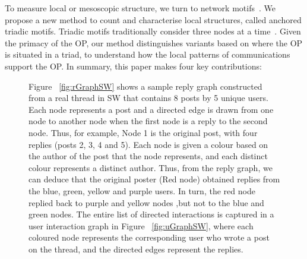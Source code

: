 To measure local or mesoscopic structure, we turn to network motifs~\cite{milo2002network}. We propose a new method to count and characterise local structures, called anchored triadic motifs. Triadic motifs traditionally consider three nodes at a time~\cite{milo2002network}. Given the primacy of the OP, our method distinguishes variants based on where the OP is situated in a triad, to understand how the local patterns of  communications support the OP.  
In summary, this paper makes four key contributions: 

\begin{figure}[!h]
    \centering
\hspace{30mm}
    
    \caption{ Figure ~\ref{fig:rGraphSW} shows a sample reply graph constructed from a real thread in SW that contains 8 posts by 5 unique users. Each node represents a post and a directed edge is drawn from one node to another node when the first node is a reply to the second node. Thus, for example, Node 1 is the original post, with four replies (posts 2, 3, 4 and 5). Each node is given a colour based on the author of the post that the node represents, and each distinct colour represents a distinct author. Thus, from the reply graph, we can deduce that the original poster (Red node) obtained replies from the blue, green, yellow and purple users. In turn, the red node replied back to purple and yellow nodes ,but not to the blue and green nodes. The entire list of directed interactions is captured in a user interaction graph in Figure ~\ref{fig:uGraphSW}, where each coloured node represents the corresponding user who wrote a post on the thread, and the directed edges represent the replies.}
    \label{Fig:GraphExamples}
\end{figure}

